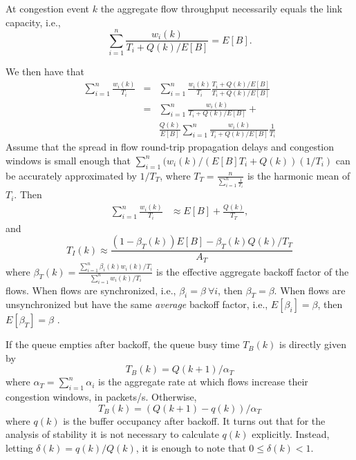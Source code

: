 \documentclass[10pt,twocolumn, journal]{IEEEtran}
\def\DLaddition#1{\noindent\ {\color{black} #1}}
\begin{document}
At congestion event $k$ the aggregate flow throughput necessarily equals the link
capacity, i.e.,
$$
\sum_{i=1}^n \frac{w_i(k)}{T_i+Q(k)/E[B]}=E[B].
$$

We then have that
\DLaddition{
\begin{eqnarray*}
    \sum_{i=1}^n \frac{w_i(k)}{T_i}
    &=&        \sum_{i=1}^n \frac{w_i(k)}{T_i}\frac{T_i + Q(k)/E[B]}{T_i + Q(k)/E[B]} \\
    &=&        \sum_{i=1}^n \frac{w_i(k)}{T_i + Q(k)/E[B]}  +
               \\ && \frac{Q(k)}{E[B]} \sum_{i=1}^n\frac{w_i(k)}{T_i + Q(k)/E[B]}\frac{1}{T_i}
 \end{eqnarray*}
 Assume that the spread in flow round-trip propagation delays and congestion windows is small enough that $\sum_{i=1}^n (w_i(k)/(E[B]T_i + Q(k))(1/T_i)$ can be accurately approximated by $1/T_T$, where $T_T=\frac{n}{\sum_{i=1}^n\frac{1}{T_i}}$ is the harmonic mean of $T_i$.  Then  
\begin{eqnarray*}
\sum_{i=1}^n \frac{w_i(k)}{T_i}&\approx  E[B]+ \frac{Q(k)}{T_T},
\end{eqnarray*} 
and
}\begin{equation}\label{eq:1}
T_I(k) \approx \frac{(1-\beta_T(k))E[B]-\beta_T(k) Q(k)/T_T}{A_T}
\end{equation}
where $\beta_T(k)=\frac{\sum_{i=1}^n \beta_i(k) w_i(k)/T_i}{\sum_{i=1}^n w_i(k)/T_i}$ is the
effective aggregate backoff factor of the flows.    When flows are synchronized, i.e.,
$\beta_i=\beta \ \forall i$, then $\beta_T=\beta$. When flows are
unsynchronized
but have the same \emph{average}
backoff factor, i.e., $E[\beta_i]=\beta$, then $E[\beta_T]=\beta$ .

If the queue empties after backoff, the queue busy time $T_B(k)$ is directly given by
\begin{equation}\label{eq:2}
T_B(k)=Q(k+1)/ \alpha_T
\end{equation}
where $\alpha_T=\sum_{i=1}^n\alpha_i$ is the aggregate rate at which flows increase their
congestion windows, in packets/s.  Otherwise,
\begin{equation}\label{eq:2a}
T_B(k)=(Q(k+1)-q(k))/ \alpha_T
\end{equation}
where $q(k)$ is the buffer occupancy after backoff.   It turns out that for the analysis
of stability it is not necessary to calculate $q(k)$ explicitly. Instead, letting
$\delta(k)=q(k)/Q(k)$, it is enough to note that $0 \leq \delta(k)<1$.
\end{document}
